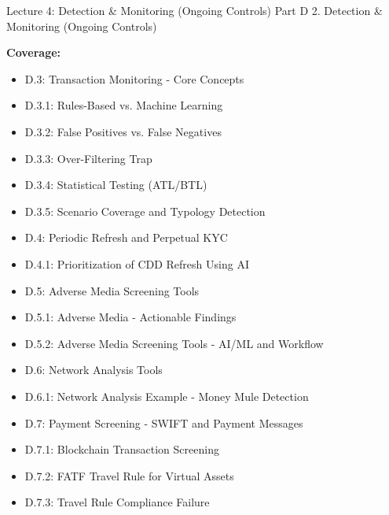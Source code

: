 \documentclass[11pt,a4paper]{beamer}
\begin{document}
\begin{frame}{Lecture 4: Detection \& Monitoring (Ongoing Controls)}
	\centering
	\Large Part D 2. Detection \& Monitoring (Ongoing Controls)
	\vspace{0.5cm}
	
	\textbf{Coverage:}
	\begin{itemize}
		\item D.3: Transaction Monitoring - Core Concepts
		\item D.3.1: Rules-Based vs. Machine Learning
		\item D.3.2: False Positives vs. False Negatives
		\item D.3.3: Over-Filtering Trap
		\item D.3.4: Statistical Testing (ATL/BTL)
		\item D.3.5: Scenario Coverage and Typology Detection
		\item D.4: Periodic Refresh and Perpetual KYC
		\item D.4.1: Prioritization of CDD Refresh Using AI
		\item D.5: Adverse Media Screening Tools
		\item D.5.1: Adverse Media - Actionable Findings
		\item D.5.2: Adverse Media Screening Tools - AI/ML and Workflow
		\item D.6: Network Analysis Tools
		\item D.6.1: Network Analysis Example - Money Mule Detection
		\item D.7: Payment Screening - SWIFT and Payment Messages
		\item D.7.1: Blockchain Transaction Screening
		\item D.7.2: FATF Travel Rule for Virtual Assets
		\item D.7.3: Travel Rule Compliance Failure
	\end{itemize}
\end{frame}
\end{document}
